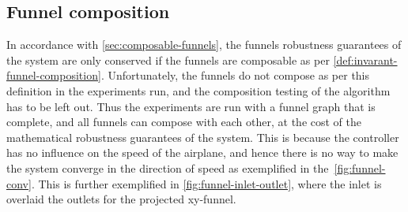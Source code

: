 \subsection{Funnel composition}
\label{subsec:funnel-no-composable}

In accordance with \cref{sec:composable-funnels}, the funnels robustness
guarantees of the system are only conserved if the funnels are composable as per
\cref{def:invarant-funnel-composition}. Unfortunately, the funnels do not
compose as per this definition in the experiments run, and the composition
testing of the algorithm has to be left out. Thus the experiments are run with a
funnel graph that is complete, and all funnels can compose with each other, at
the cost of the mathematical robustness guarantees of the system. This is
because the controller has no influence on the speed of the airplane, and hence
there is no way to make the system converge in the direction of speed as
exemplified in the~\cref{fig:funnel-conv}. This is further exemplified in
\cref{fig:funnel-inlet-outlet}, where the inlet is overlaid the outlets for the
projected xy-funnel.

